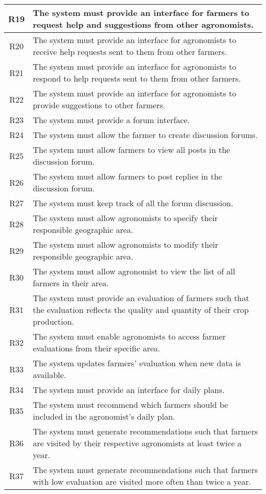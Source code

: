\begin{longtable}{|c|>{\raggedright\arraybackslash}m{15cm}|}
R19	& The system must provide an interface for farmers to request help and suggestions from other agronomists.\\\hline
R20	& The system must provide an interface for agronomists to receive help requests sent to them from other farmers.\\\hline
R21	& The system must provide an interface for agronomists to respond to help requests sent to them from other farmers.\\\hline
R22	& The system must provide an interface for agronomists to provide suggestions to other farmers.\\\hline
R23	& The system must provide a forum interface.\\\hline
R24	& The system must allow the farmer to create discussion forums.\\\hline
R25	& The system must allow farmers to view all posts in the discussion forum.\\\hline
R26	& The system must allow farmers to post replies in the discussion forum.\\\hline
R27	& The system must keep track of all the forum discussion.\\\hline
R28	& The system must allow agronomists to specify their responsible geographic area.\\\hline
R29	& The system must allow agronomists to modify their responsible geographic area.\\\hline 
R30	& The system must allow agronomist to view the list of all farmers in their area. \\\hline
R31	& The system must provide an evaluation of farmers such that the evaluation reflects the quality and quantity of their crop production.\\\hline
R32	& The system must enable agronomists to access farmer evaluations from their specific area.\\\hline
R33	& The system updates farmers' evaluation when new data is available.\\\hline %
R34	& The system must provide an interface for daily plans.\\\hline
R35	& The system must recommend which farmers should be included in the agronomist's daily plan.\\\hline
R36	& The system must generate recommendations such that farmers are visited by their respective agronomists at least twice a year.\\\hline
R37	& The system must generate recommendations such that farmers with low evaluation are visited more often than twice a year.\\\hline

\end{longtable}
